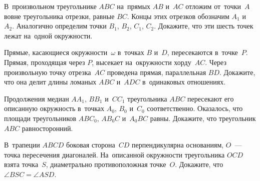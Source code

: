 \begin{problems}
\item
В~произвольном треугольнике $ABC$ на~прямых $AB$ и~$AC$ отложим от~точки~$A$
вовне треугольника отрезки, равные $BC$.
Концы этих отрезков обозначим $A_1$ и~$A_2$.
Аналогично определим точки $B_1$, $B_2$, $C_1$, $C_2$.
Докажите, что эти шесть точек лежат на~одной окружности.

\item
Прямые, касающиеся окружности~$\omega$ в~точках $B$ и~$D$, пересекаются
в~точке~$P$.
Прямая, проходящая через $P$, высекает на~окружности хорду~$AC$.
Через произвольную точку отрезка~$AC$ проведена прямая, параллельная $BD$.
Докажите, что она делит длины ломаных $ABC$ и~$ADC$ в~одинаковых отношениях.

\item
Продолжения медиан $A A_1$, $B B_1$ и~$C C_1$ треугольника $ABC$ пересекают его
описанную окружность в~точках $A_0$, $B_0$ и~$C_0$ соответственно.
Оказалось, что площади треугольников $A B C_0$, $A B_0 C$ и~$A_0 B C$ равны.
Докажите, что треугольник $ABC$ равносторонний.

\item
В~трапеции $ABCD$ боковая сторона~$CD$ перпендикулярна основаниям,
$O$~--- точка пересечения диагоналей.
На~описанной окружности треугольника $OCD$ взята точка~$S$, диаметрально
противоположная точке~$O$.
Докажите, что $\angle BSC = \angle ASD$.

\end{problems}

